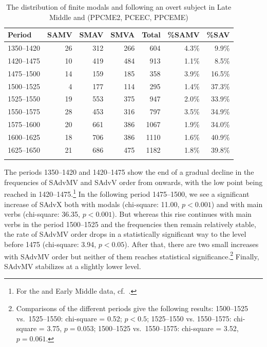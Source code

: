 \documentclass[output=paper]{langsci/langscibook}
\begin{document}
\begin{table}
\caption{The distribution of finite modals and  following an overt
    subject in Late Middle and  (PPCME2, PCEEC,
PPCEME)\label{tab:key:09.1}}
\begin{tabular}{lrrrrrr}
\lsptoprule
{Period} & {SAMV} & {SMAV} & {SMVA} & {Total} & {\%SAMV} & {\%SAV}\\
\midrule
1350--1420 & 26 & 312 & 266 & 604 & 4.3\% & 9.9\%\\
1420--1475 & 10 & 419 & 484 & 913 & 1.1\% & 8.5\%\\
1475--1500 & 14 & 159 & 185 & 358 & 3.9\% & 16.5\%\\
1500--1525 & 4 & 177 & 114 & 295 & 1.4\% & 37.3\%\\
1525--1550 & 19 & 553 & 375 & 947 & 2.0\% & 33.9\%\\
1550--1575 & 28 & 453 & 316 & 797 & 3.5\% & 34.9\%\\
1575--1600 & 20 & 661 & 386 & 1067 & 1.9\% & 34.0\%\\
1600--1625 & 18 & 706 & 386 & 1110 & 1.6\% & 40.9\%\\
1625--1650 & 21 & 686 & 475 & 1182 & 1.8\% & 39.8\%\\
\lspbottomrule
\end{tabular}
\end{table}

The periods 1350--1420 and 1420--1475 show the end of a gradual decline in the
frequencies of SAdvMV and SAdvV order from  onwards, with the low
point being reached in 1420--1475.\footnote{For the  and Early
Middle  data, cf.\ \textcites[512]{HaeIhs2016}{HaeIhsta}.}  In the
following period 1475--1500, we see a significant increase of SAdvX both with
modals (chi-square: 11.00, $p < 0.001$) and with main verbs (chi-square: 36.35, $p
< 0.001$). But whereas this rise continues with main verbs in the period
1500--1525 and the frequencies then remain relatively stable, the rate of SAdvMV
order drops in a statistically significant way to the level before 1475
(chi-square: 3.94, $p < 0.05$). After that, there are two small increases with
SAdvMV order but neither of them reaches statistical
significance.\footnote{Comparisons of the different periods give the following
    results: 1500--1525 vs.\ 1525--1550: chi-square = 0.52; $p < 0.5$; 1525--1550 vs.
    1550--1575: chi-square = 3.75, $p = 0.053$; 1500--1525 vs.\  1550--1575:
chi-square = 3.52, $p = 0.061$.} Finally, SAdvMV stabilizes at a slightly lower
level.
\end{document}

